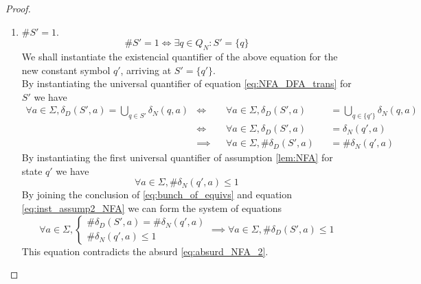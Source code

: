 \documentclass[docid=TP03]{tcom_TP}
\begin{document}
{\begin{proof}
\begin{enumerate}
			\begin{equation}
				\#S'=0 \iff S'=\emptyset
			\end{equation}
			By convention, $\forall a \in \Sigma, \delta_D(\emptyset,a)=\emptyset$.
			\begin{equation}
				\forall a \in \Sigma, \delta_D(\emptyset,a)=\emptyset
				\iff \forall a \in \Sigma, \delta_D(S',a)=\emptyset
			\end{equation}
			which contradicts the absurd \eqref{eq:absurd_NFA_2}.
		\item $\#S'=1$.
			\begin{equation}
				\#S'=1 \iff \exists q \in Q_N\colon S'=\{q\}
			\end{equation}
			We shall instantiate the existencial quantifier of the above equation for the new constant symbol $q'$, arriving at $S'=\{q'\}$.\\
			By instantiating the universal quantifier of equation \eqref{eq:NFA_DFA_trans} for $S'$ we have
			\begin{equation} \label{eq:bunch_of_equivs}
			\begin{alignedat}{3}
				\forall a \in \Sigma, \delta_D(S',a)=\bigcup_{q\in S'}{\delta_N(q,a)}
				&\iff     && \forall a \in \Sigma, \delta_D(S',a)  &&=\bigcup_{q\in \{q'\}}{\delta_N(q,a)}\\
				&\iff     && \forall a \in \Sigma, \delta_D(S',a)  &&=\delta_N(q',a)\\
				&\implies && \forall a \in \Sigma, \#\delta_D(S',a)&&=\#\delta_N(q',a)
			\end{alignedat}
			\end{equation}
			By instantiating the first universal quantifier of assumption \eqref{lem:NFA} for state $q'$ we have
			\begin{equation} \label{eq:inst_assump2_NFA}
				\forall a \in \Sigma, \#\delta_N(q',a)\leq 1
			\end{equation}
			By joining the conclusion of \eqref{eq:bunch_of_equivs} and equation \eqref{eq:inst_assump2_NFA} we can form the system of equations
			\begin{equation}
				\forall a \in \Sigma, \begin{cases}
						\#\delta_D(S',a)=\#\delta_N(q',a)\\
						\#\delta_N(q',a)\leq 1
					\end{cases}
				\implies \forall a \in \Sigma, \#\delta_D(S',a)\leq 1
			\end{equation}
			This equation contradicts the absurd \eqref{eq:absurd_NFA_2}.

\end{enumerate}
\end{proof}}
\end{document}
